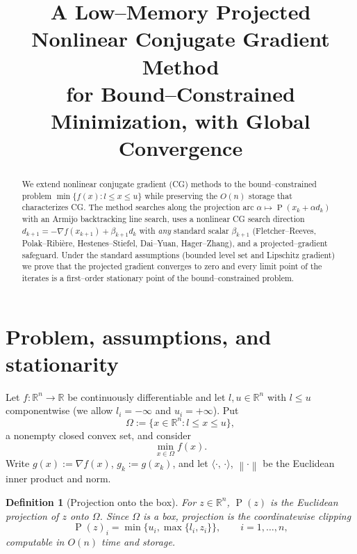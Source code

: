 \documentclass[12pt]{article}
\newtheorem{definition}{Definition}
\DeclareMathOperator{\proj}{P}
\newcommand{\R}{\mathbb{R}}
\newcommand{\norm}[1]{\left\lVert #1 \right\rVert}
\newcommand{\inner}[2]{\langle #1,\, #2\rangle}
\begin{document}
\title{A Low--Memory Projected Nonlinear Conjugate Gradient Method\\
for Bound--Constrained Minimization, with Global Convergence}
\author{}
\date{}
\maketitle

\begin{abstract}
We extend nonlinear conjugate gradient (CG) methods to the bound--constrained
problem $\min\{f(x):l\le x\le u\}$ while preserving the $O(n)$ storage that
characterizes CG. The method searches along the projection arc
$\alpha\mapsto\proj(x_k+\alpha d_k)$ with an Armijo backtracking line search,
uses a nonlinear CG search direction $d_{k+1}=-\nabla f(x_{k+1})+\beta_{k+1}d_k$
with \emph{any} standard scalar $\beta_{k+1}$ (Fletcher--Reeves,
Polak--Ribi\`ere, Hestenes--Stiefel, Dai--Yuan, Hager--Zhang), and a
projected--gradient safeguard. Under the standard assumptions (bounded level
set and Lipschitz gradient) we prove that the projected gradient converges to
zero and every limit point of the iterates is a first--order stationary point
of the bound--constrained problem.
\end{abstract}

\section{Problem, assumptions, and stationarity}

Let $f:\R^n\to\R$ be continuously differentiable and let $l,u\in\R^n$ with
$l\le u$ componentwise (we allow $l_i=-\infty$ and $u_i=+\infty$). Put
\[
\Omega:=\{x\in\R^n: l\le x\le u\},
\]
a nonempty closed convex set, and consider
\begin{equation}\label{eq:prob}
\min_{x\in\Omega} f(x).
\end{equation}
Write $g(x):=\nabla f(x)$, $g_k:=g(x_k)$, and let $\inner{\cdot}{\cdot}$,
$\norm{\cdot}$ be the Euclidean inner product and norm.

\begin{definition}[Projection onto the box]\label{def:proj}
For $z\in\R^n$, $\proj(z)$ is the Euclidean projection of $z$ onto $\Omega$.
Since $\Omega$ is a box, projection is the coordinatewise clipping
\begin{equation}\label{eq:projformula}
\proj(z)_i=\min\{u_i,\max\{l_i,z_i\}\},\qquad i=1,\dots,n,
\end{equation}
computable in $O(n)$ time and storage.
\end{definition}
\end{document}
